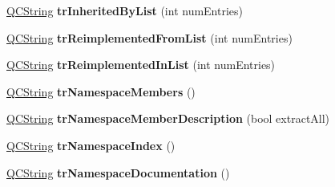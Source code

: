 \begin{DoxyCompactItemize}
\item 
\hypertarget{class_translator_croatian_a1e99444f13f4aaf4381915a7ef64b7e2}{\hyperlink{class_q_c_string}{Q\-C\-String} {\bfseries tr\-Inherited\-By\-List} (int num\-Entries)}\label{class_translator_croatian_a1e99444f13f4aaf4381915a7ef64b7e2}

\item 
\hypertarget{class_translator_croatian_a415a7fcbadfe96bd0ca26878e710c148}{\hyperlink{class_q_c_string}{Q\-C\-String} {\bfseries tr\-Reimplemented\-From\-List} (int num\-Entries)}\label{class_translator_croatian_a415a7fcbadfe96bd0ca26878e710c148}

\item 
\hypertarget{class_translator_croatian_a03896d92ba89b64025ceb367fda22ffb}{\hyperlink{class_q_c_string}{Q\-C\-String} {\bfseries tr\-Reimplemented\-In\-List} (int num\-Entries)}\label{class_translator_croatian_a03896d92ba89b64025ceb367fda22ffb}

\item 
\hypertarget{class_translator_croatian_aab3cb0a2b1911abb6aaa26098a2ba334}{\hyperlink{class_q_c_string}{Q\-C\-String} {\bfseries tr\-Namespace\-Members} ()}\label{class_translator_croatian_aab3cb0a2b1911abb6aaa26098a2ba334}

\item 
\hypertarget{class_translator_croatian_aee9c71c61972950fb45524dbecfa54f9}{\hyperlink{class_q_c_string}{Q\-C\-String} {\bfseries tr\-Namespace\-Member\-Description} (bool extract\-All)}\label{class_translator_croatian_aee9c71c61972950fb45524dbecfa54f9}

\item 
\hypertarget{class_translator_croatian_a3366fecf1ff5ff616f74822b96b0d9fb}{\hyperlink{class_q_c_string}{Q\-C\-String} {\bfseries tr\-Namespace\-Index} ()}\label{class_translator_croatian_a3366fecf1ff5ff616f74822b96b0d9fb}

\item 
\hypertarget{class_translator_croatian_a4b378c543e22d6041d618cffdb734842}{\hyperlink{class_q_c_string}{Q\-C\-String} {\bfseries tr\-Namespace\-Documentation} ()}\label{class_translator_croatian_a4b378c543e22d6041d618cffdb734842}


\end{DoxyCompactItemize}
